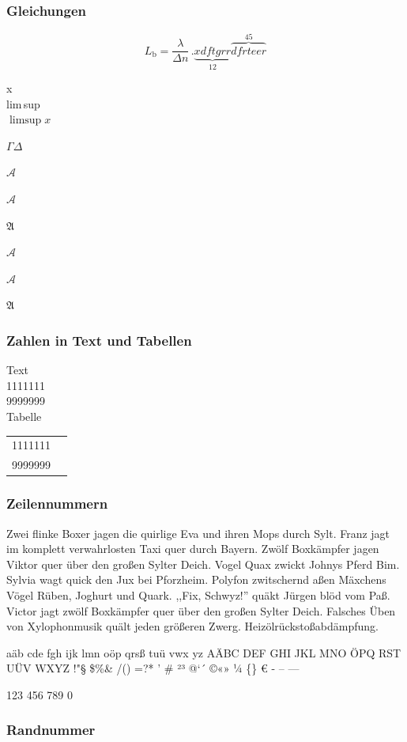 \documentclass[english,ngerman]{book}%
\makeatletter
\theoremstyle{dgdef}
\theoremstyle{dgthm}
\newcommand{\kurzerblindtext}{%
\noindent{}Zwei flinke Boxer jagen die quirlige Eva und ihren Mops durch Sylt. Franz jagt im komplett verwahrlosten Taxi quer durch
  Bayern. Zwölf Boxkämpfer jagen Viktor quer über den großen Sylter Deich. Vogel Quax zwickt Johnys Pferd Bim. Sylvia wagt quick
  den Jux bei Pforzheim. Polyfon zwitschernd aßen Mäxchens Vögel Rüben, Joghurt und Quark. ,,Fix, Schwyz!'' quäkt Jürgen blöd vom
  Paß. Victor jagt zwölf Boxkämpfer quer über den großen Sylter Deich. Falsches Üben von Xylophonmusik quält jeden größeren
  Zwerg. Heizölrückstoßabdämpfung.

  aäb cde fgh ijk lmn oöp qrsß tuü vwx yz AÄBC DEF GHI JKL MNO ÖPQ RST UÜV WXYZ !"§ \$\%\& /() =?* ' \# \symbol{"7E} ²³ @`´ ©«» ¼ \{\} €  - -- ---

  123 456 789 0
}
\makeatother
\begin{document}
\subsubsection{Gleichungen}

\begin{equation}\label{eq:4.6}
  L_{\text{b}} = \frac{\lambda}{\Delta n}\,. \underbrace{xdftgrr}_{12} \overbrace{dfrteer}^{45}
\end{equation}

x\\
lim\,sup\\
$\limsup x $


$\Gamma\Delta$

$\mathcal{A}$

$\mathscr{A}$

$\mathfrak{A} $%

{
$\mathcal{A}$

$\mathscr{A}$

$\mathfrak{A} $%
}

\subsubsection{Zahlen in Text und Tabellen}

Text\\
  1111111\\
  9999999\\
Tabelle\\
\begin{tabular}{ll}
  1111111\\
  9999999\\
\end{tabular}



\subsubsection{Zeilennummern}
\linenumbers

\noindent

\kurzerblindtext

\nolinenumbers

\subsubsection{Randnummer}

\noindent{}%
\end{document}

